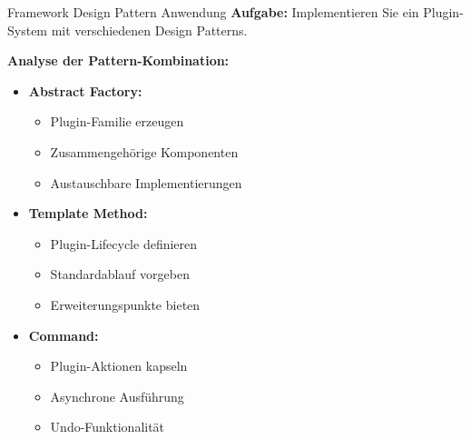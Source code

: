\begin{example}{Framework Design Pattern Anwendung}
\textbf{Aufgabe:}
Implementieren Sie ein Plugin-System mit verschiedenen Design Patterns.

\textbf{Analyse der Pattern-Kombination:}
\begin{itemize}
    \item \textbf{Abstract Factory:}
    \begin{itemize}
        \item Plugin-Familie erzeugen
        \item Zusammengehörige Komponenten
        \item Austauschbare Implementierungen
    \end{itemize}
    
    \item \textbf{Template Method:}
    \begin{itemize}
        \item Plugin-Lifecycle definieren
        \item Standardablauf vorgeben
        \item Erweiterungspunkte bieten
    \end{itemize}
    
    \item \textbf{Command:}
    \begin{itemize}
        \item Plugin-Aktionen kapseln
        \item Asynchrone Ausführung
        \item Undo-Funktionalität
    \end{itemize}
\end{itemize}
\end{example}

